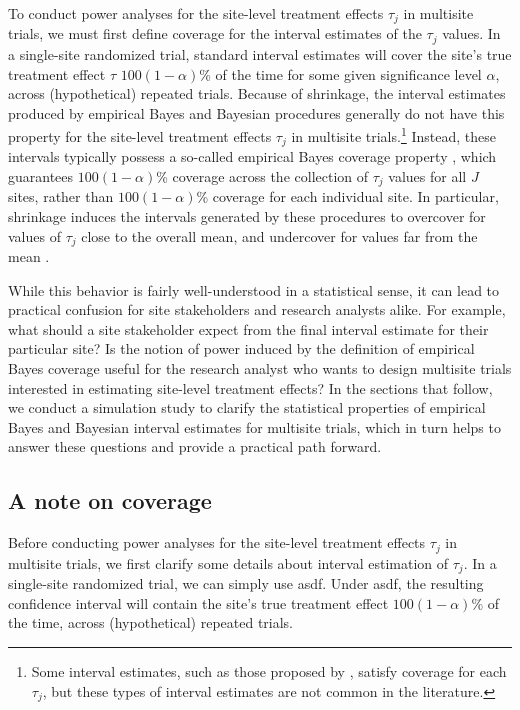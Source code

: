 \documentclass[]{article}
\begin{document}
To conduct power analyses for the site-level treatment effects $\tau_j$ in multisite trials, we must first define coverage for the interval estimates of the $\tau_j$ values.
In a single-site randomized trial, standard interval estimates will cover the site's true treatment effect $\tau$ $100(1-\alpha)$\% of the time for some given significance level $\alpha$, across (hypothetical) repeated trials.
Because of shrinkage, the interval estimates produced by empirical Bayes and Bayesian procedures generally do not have this property for the site-level treatment effects $\tau_j$ in multisite trials.\footnote{Some interval estimates, such as those proposed by \citet{yu2018adaptive}, satisfy coverage for each $\tau_j$, but these types of interval estimates are not common in the literature.}
Instead, these intervals typically possess a so-called empirical Bayes coverage property \citep{morris1983parametric}, which guarantees $100(1-\alpha)$\% coverage across the collection of $\tau_j$ values for all $J$ sites, rather than $100(1-\alpha)$\% coverage for each individual site.
In particular, shrinkage induces the intervals generated by these procedures to overcover for values of $\tau_j$ close to the overall mean, and undercover for values far from the mean \citep{snijders2011multilevel}.

While this behavior is fairly well-understood in a statistical sense, it can lead to practical confusion for site stakeholders and research analysts alike.
For example, what should a site stakeholder expect from the final interval estimate for their particular site?
Is the notion of power induced by the definition of empirical Bayes coverage useful for the research analyst who wants to design multisite trials interested in estimating site-level treatment effects?
In the sections that follow, we conduct a simulation study to clarify the statistical properties of empirical Bayes and Bayesian interval estimates for multisite trials, which in turn helps to answer these questions and provide a practical path forward.


\subsection{A note on coverage}

Before conducting power analyses for the site-level treatment effects $\tau_j$ in multisite trials, we first clarify some details about interval estimation of $\tau_j$.
In a single-site randomized trial, we can simply use asdf.
Under asdf, the resulting confidence interval will contain the site's true treatment effect $100(1-\alpha)$\% of the time, across (hypothetical) repeated trials.
\end{document}
